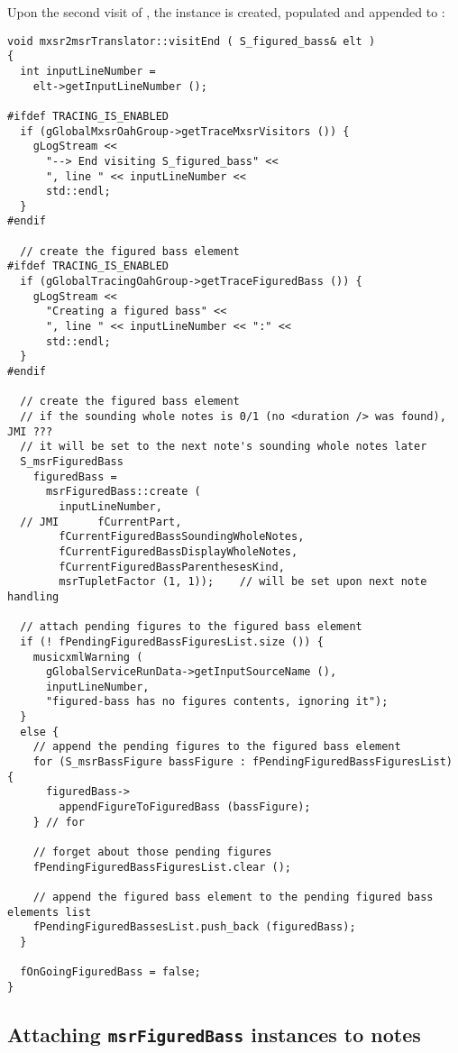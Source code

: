 Upon the second visit of , the  instance is created, populated and appended to :
\begin{lstlisting}[language=CPlusPlus]
void mxsr2msrTranslator::visitEnd ( S_figured_bass& elt )
{
  int inputLineNumber =
    elt->getInputLineNumber ();

#ifdef TRACING_IS_ENABLED
  if (gGlobalMxsrOahGroup->getTraceMxsrVisitors ()) {
    gLogStream <<
      "--> End visiting S_figured_bass" <<
      ", line " << inputLineNumber <<
      std::endl;
  }
#endif

  // create the figured bass element
#ifdef TRACING_IS_ENABLED
  if (gGlobalTracingOahGroup->getTraceFiguredBass ()) {
    gLogStream <<
      "Creating a figured bass" <<
      ", line " << inputLineNumber << ":" <<
      std::endl;
  }
#endif

  // create the figured bass element
  // if the sounding whole notes is 0/1 (no <duration /> was found), JMI ???
  // it will be set to the next note's sounding whole notes later
  S_msrFiguredBass
    figuredBass =
      msrFiguredBass::create (
        inputLineNumber,
  // JMI      fCurrentPart,
        fCurrentFiguredBassSoundingWholeNotes,
        fCurrentFiguredBassDisplayWholeNotes,
        fCurrentFiguredBassParenthesesKind,
        msrTupletFactor (1, 1));    // will be set upon next note handling

  // attach pending figures to the figured bass element
  if (! fPendingFiguredBassFiguresList.size ()) {
    musicxmlWarning (
      gGlobalServiceRunData->getInputSourceName (),
      inputLineNumber,
      "figured-bass has no figures contents, ignoring it");
  }
  else {
    // append the pending figures to the figured bass element
    for (S_msrBassFigure bassFigure : fPendingFiguredBassFiguresList) {
      figuredBass->
        appendFigureToFiguredBass (bassFigure);
    } // for

    // forget about those pending figures
    fPendingFiguredBassFiguresList.clear ();

    // append the figured bass element to the pending figured bass elements list
    fPendingFiguredBassesList.push_back (figuredBass);
  }

  fOnGoingFiguredBass = false;
}
\end{lstlisting}


\subsection{Attaching {\tt msrFiguredBass} instances to notes}

